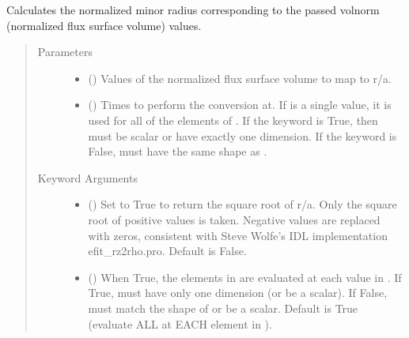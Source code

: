 \documentclass[letterpaper,10pt,english]{sphinxmanual}
\begin{document}
\begin{fulllineitems}
\begin{fulllineitems}
\label{\detokenize{eqtools:eqtools.core.Equilibrium.volnorm2roa}}
Calculates the normalized minor radius corresponding to the passed volnorm (normalized flux surface volume) values.
\begin{quote}\begin{description}
\item[{Parameters}] \leavevmode\begin{itemize}
\item {} 
 () \textendash{} Values of the normalized
flux surface volume to map to r/a.

\item {} 
 () \textendash{} Times to perform the conversion at.
If  is a single value, it is used for all of the elements of
. If the  keyword is True, then  must be scalar
or have exactly one dimension. If the  keyword is False,
 must have the same shape as .

\end{itemize}

\item[{Keyword Arguments}] \leavevmode\begin{itemize}
\item {} 
 () \textendash{} Set to True to return the square root of r/a.
Only the square root of positive values is taken. Negative
values are replaced with zeros, consistent with Steve Wolfe’s
IDL implementation efit\_rz2rho.pro. Default is False.

\item {} 
 () \textendash{} When True, the elements in  are evaluated
at each value in . If True,  must have only one dimension
(or be a scalar). If False,  must match the shape of 
or be a scalar. Default is True (evaluate ALL  at EACH
element in ).


\end{itemize}
\end{description}
\end{quote}
\end{fulllineitems}
\end{fulllineitems}
\end{document}
